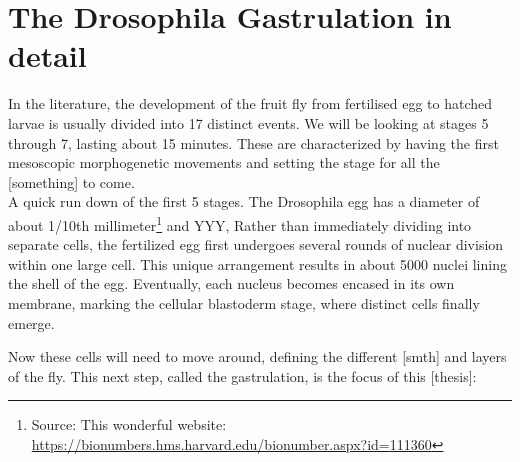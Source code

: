



\newpage
\section{The Drosophila Gastrulation in detail}
In the literature, the development of the fruit fly from fertilised egg to hatched larvae is usually divided into 17 distinct events.\cite{bownes1975photographic} We will be looking at stages 5 through 7, lasting about 15 minutes. These are characterized by having the first mesoscopic morphogenetic movements and setting the stage for all the [something] to come.\\
A quick run down of the first 5 stages.
The Drosophila egg has a diameter of about 1/10th millimeter\footnote{Source: This wonderful website: \url{https://bionumbers.hms.harvard.edu/bionumber.aspx?id=111360}} and YYY, 
Rather than immediately dividing into separate cells, the fertilized egg first undergoes several rounds of nuclear division within one large cell. This unique arrangement results in about 5000 nuclei lining the shell of the egg. Eventually, each nucleus becomes encased in its own membrane, marking the cellular blastoderm stage, where distinct cells finally emerge.


Now these cells will need to move around, defining the different [smth] and layers of the fly. This next step, called the gastrulation, is the focus of this [thesis]:

